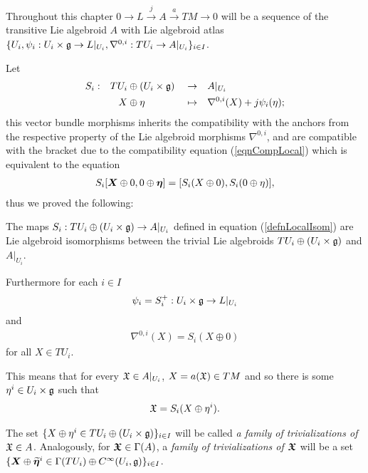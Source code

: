 Throughout this chapter $0 \to L \xrightarrow{j} A \xrightarrow{a} TM \to 0$ will be a sequence of the transitive Lie algebroid $A$ with Lie algebroid atlas $\{U_i, \psi_i:U_i \times \mathfrak{g}\to L|_{U_i}, \nabla^{0,i}:TU_i \to A|_{U_i}\}_{i \in I}$.

Let
\begin{align}\label{defnLocalIsom}
    S_i:&& TU_i &\oplus (U_i \times \mathfrak{g}) &&\to&& A|_{U_i}\\
        && X &\oplus \eta && \mapsto && \nabla^{0,i}(X) + j\psi_i(\eta);
\end{align}
this vector bundle morphisms inherits the compatibility with the anchors from the respective property of the Lie algebroid morphisms $\nabla^{0,i}$, and are compatible with the bracket due to the compatibility equation (\ref{eqnCompLocal}) which is equivalent to the equation
\begin{align*}
    S_i[\bm{X} \oplus 0, 0 \oplus \bm{\eta}] = [S_i(X \oplus 0), S_i(0 \oplus \eta)],
\end{align*} thus we proved the following:

\begin{theorem}
The maps $S_i : TU_i \oplus (U_i \times \mathfrak{g}) \to A|_{U_i}$ defined in equation (\ref{defnLocalIsom}) are Lie algebroid isomorphisms between the trivial Lie algebroids $TU_i \oplus (U_i \times \mathfrak{g})$ and $A|_{U_i}$.

Furthermore for each $i \in I$ 
\begin{align*}
    \psi_i = S_i^+: U_i \times \mathfrak{g} \to L|_{U_i}
\end{align*} and 
\begin{align*}
    \nabla^{0,i}(X) = S_i(X \oplus 0)
\end{align*}
for all $X \in TU_i$.
\end{theorem}

This means that for every $\mathfrak{X} \in A|_{U_{i}}$, $X = a(\mathfrak{X}) \in TM$ and so there is some $\eta^i \in U_i \times \mathfrak{g}$ such that
\begin{align}
    \mathfrak{X} = S_i(X \oplus \eta^i).
\end{align}

\begin{definition}
The set $\{X \oplus \eta^i \in TU_i \oplus (U_i \times \mathfrak{g})\}_{i \in I}$ will be called \emph{a family of trivializations of $\mathfrak{X} \in A$}. Analogously, for $\bm{\mathfrak{X}} \in \Gamma(A)$, a \emph{family of trivializations of $\bm{\mathfrak{X}}$} will be a set $\{\bm{X} \oplus \widetilde{\bm{\eta}}^i \in \Gamma(TU_i) \oplus C^\infty(U_i, \mathfrak{g})\}_{i \in I}$.
\end{definition}

